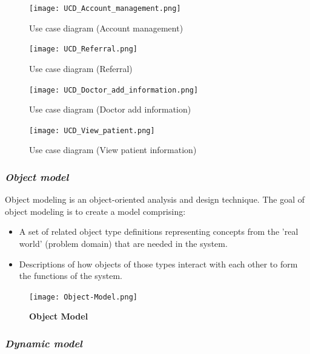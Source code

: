 \documentclass[a4paper]{article}
\begin{document}
\FloatBarrier

\begin{figure}[h!]
\caption{Use case diagram (Account management)}
\centering
\texttt{[image: UCD\_Account\_management.png]}
\end{figure}

\begin{figure}[h!]
\caption{Use case diagram (Referral)}
\centering
\texttt{[image: UCD\_Referral.png]}
\end{figure}

\begin{figure}[h!]
\caption{Use case diagram (Doctor add information)}
\centering
\texttt{[image: UCD\_Doctor\_add\_information.png]}
\end{figure}

\begin{figure}[h!]
\caption{Use case diagram (View patient information)}
\centering
\texttt{[image: UCD\_View\_patient.png]}
\end{figure}

\FloatBarrier

\subsubsection{\textit{Object model}}

Object modeling is an object-oriented analysis and design technique. The goal of object modeling is to create a model comprising:

\begin{itemize}
\item A set of related object type definitions representing concepts from the 'real world' (problem domain) that are needed in the system.
\item Descriptions of how objects of those types interact with each other to form the functions of the system.
\end{itemize}

\FloatBarrier

\begin{figure}[h!]
\caption*{\textbf{Object Model}}
\label{ObjMdl}
\centering 
\texttt{[image: Object-Model.png]}
\end{figure}

\FloatBarrier

\subsubsection{\textit{Dynamic model}}
\end{document}

